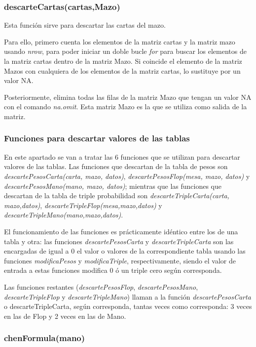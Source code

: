 \subsubsection{descarteCartas(cartas,Mazo)}

Esta función sirve para descartar las cartas del mazo.

Para ello, primero cuenta los elementos de la matriz cartas y la matriz mazo usando \textit{nrow}, para poder iniciar un doble bucle \textit{for} para buscar los elementos de la matriz cartas dentro de la matriz Mazo. Si coincide el elemento de la matriz Mazos con cualquiera de los elementos de la matriz cartas, lo sustituye por un valor NA.

Posteriormente, elimina todas las filas de la matriz Mazo que tengan un valor NA con el comando \textit{na.omit}. Esta matriz Mazo es la que se utiliza como salida de la matriz.


\subsubsection{Funciones para descartar valores de las tablas}

En este apartado se van a tratar las 6 funciones que se utilizan para descartar valores de las tablas. Las funciones que descartan de la tabla de pesos son \textit{descartePesosCarta(carta, mazo, datos)}, \textit{descartePesosFlop(mesa, mazo, datos)} y \textit{descartePesosMano(mano, mazo, datos)}; mientras que las funciones que descartan de la tabla de triple probabilidad son \textit{descarteTripleCarta(carta, mazo,datos)}, \textit{descarteTripleFlop(mesa,mazo,datos)} y \textit{descarteTripleMano(mano,mazo,datos)}.

El funcionamiento de las funciones es prácticamente idéntico entre los de una tabla y otra: las funciones \textit{descartePesosCarta} y \textit{descarteTripleCarta} son las encargadas de igual a 0 el valor o valores de la correspondiente tabla usando las funciones \textit{modificaPesos} y \textit{modificaTriple}, respectivamente, siendo el valor de entrada a estas funciones modifica 0 ó un triple cero según corresponda.

Las funciones restantes (\textit{descartePesosFlop}, \textit{descartePesosMano}, \textit{descarteTripleFlop} y \textit{descarteTripleMano}) llaman a la función \textit{descartePesosCarta} o descarteTripleCarta, según corresponda, tantas veces como corresponda: 3 veces en las de Flop y 2 veces en las de Mano.

\subsubsection{chenFormula(mano)}

